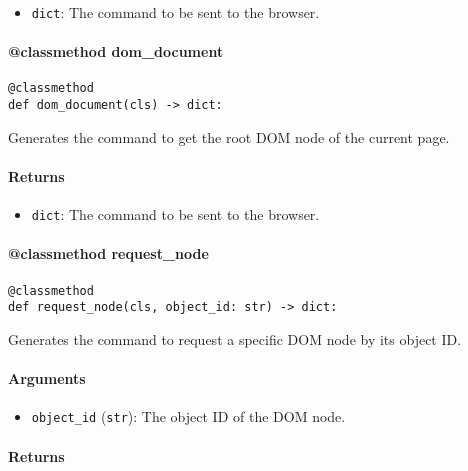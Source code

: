 \documentclass{article}
\begin{document}
\begin{itemize}
    \item \lstinline[style=pythonstyle]|dict|: The command to be sent to the browser.
\end{itemize}

\paragraph{@classmethod dom\_document}

\begin{lstlisting}[style=pythonstyle]
@classmethod
def dom_document(cls) -> dict:
\end{lstlisting}

\noindent Generates the command to get the root DOM node of the current page.

\paragraph{Returns}

\begin{itemize}
    \item \lstinline[style=pythonstyle]|dict|: The command to be sent to the browser.
\end{itemize}

\paragraph{@classmethod request\_node}

\begin{lstlisting}[style=pythonstyle]
@classmethod
def request_node(cls, object_id: str) -> dict:
\end{lstlisting}

\noindent Generates the command to request a specific DOM node by its object ID.

\paragraph{Arguments}

\begin{itemize}
    \item \lstinline[style=pythonstyle]|object_id| (\lstinline[style=pythonstyle]|str|): The object ID of the DOM node.
\end{itemize}

\paragraph{Returns}
\end{document}
